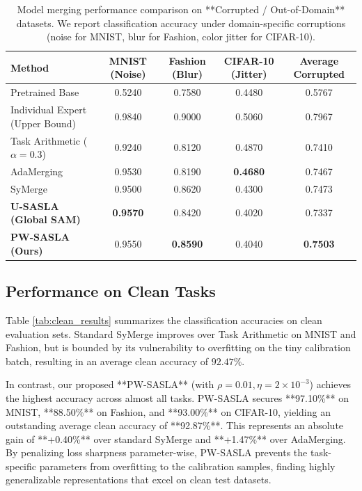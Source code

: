 \documentclass{article}
\theoremstyle{plain}
\theoremstyle{definition}
\theoremstyle{remark}
\begin{document}
\begin{table}[t]
\caption{Model merging performance comparison on **Corrupted / Out-of-Domain** datasets. We report classification accuracy under domain-specific corruptions (noise for MNIST, blur for Fashion, color jitter for CIFAR-10).}
\label{tab:corr_results}
\vskip 0.15in
\begin{center}
\begin{small}
\begin{sc}
\begin{tabular}{lcccc}
\toprule
Method & MNIST (Noise) & Fashion (Blur) & CIFAR-10 (Jitter) & Average Corrupted \\
\midrule
Pretrained Base & 0.5240 & 0.7580 & 0.4480 & 0.5767 \\
Individual Expert (Upper Bound) & 0.9840 & 0.9000 & 0.5060 & 0.7967 \\
\midrule
Task Arithmetic ($\alpha=0.3$) & 0.9240 & 0.8120 & 0.4870 & 0.7410 \\
AdaMerging & 0.9530 & 0.8190 & \textbf{0.4680} & 0.7467 \\
SyMerge & 0.9500 & 0.8620 & 0.4300 & 0.7473 \\
\textbf{U-SASLA (Global SAM)} & \textbf{0.9570} & 0.8420 & 0.4020 & 0.7337 \\
\textbf{PW-SASLA (Ours)} & 0.9550 & \textbf{0.8590} & 0.4040 & \textbf{0.7503} \\
\bottomrule
\end{tabular}
\end{sc}
\end{small}
\end{center}
\vskip -0.1in
\end{table}

\subsection{Performance on Clean Tasks}
Table \ref{tab:clean_results} summarizes the classification accuracies on clean evaluation sets. Standard SyMerge improves over Task Arithmetic on MNIST and Fashion, but is bounded by its vulnerability to overfitting on the tiny calibration batch, resulting in an average clean accuracy of $92.47\%$.

In contrast, our proposed **PW-SASLA** (with $\rho=0.01, \eta=2\times 10^{-3}$) achieves the highest accuracy across almost all tasks. PW-SASLA secures **97.10\%** on MNIST, **88.50\%** on Fashion, and **93.00\%** on CIFAR-10, yielding an outstanding average clean accuracy of **92.87\%**. This represents an absolute gain of **+0.40\%** over standard SyMerge and **+1.47\%** over AdaMerging. By penalizing loss sharpness parameter-wise, PW-SASLA prevents the task-specific parameters from overfitting to the calibration samples, finding highly generalizable representations that excel on clean test datasets.
\end{document}
